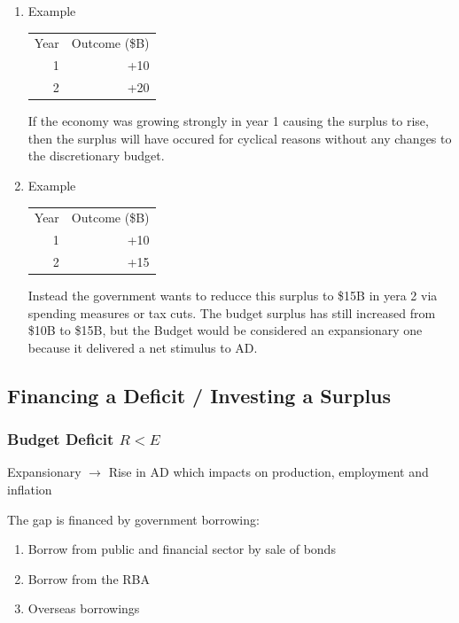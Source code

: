 \documentclass[11pt]{article}
\begin{document}
\begin{enumerate}
\item Example
\label{sec-1-8-2-1}

\begin{center}
\begin{tabular}{rr}
Year & Outcome (\$B)\\
1 & +10\\
2 & +20\\
\end{tabular}
\end{center}

If the economy was growing strongly in year 1 causing the surplus to
rise, then the surplus will have occured for cyclical reasons without
any changes to the discretionary budget.

\item Example
\label{sec-1-8-2-2}


\begin{center}
\begin{tabular}{rr}
Year & Outcome (\$B)\\
1 & +10\\
2 & +15\\
\end{tabular}
\end{center}

Instead the government wants to reducce this surplus to \$15B in yera 2
via spending measures or tax cuts. The budget surplus has still
increased from \$10B to \$15B, but the Budget would be considered an
expansionary one because it delivered a net stimulus to AD.
\end{enumerate}


\subsection{Financing a Deficit / Investing a Surplus}
\label{sec-1-9}

\subsubsection{Budget Deficit $R < E$}
\label{sec-1-9-1}

Expansionary $\rightarrow$ Rise in AD which impacts on production,
employment and inflation

The gap is financed by government borrowing:

\begin{enumerate}
\item Borrow from public and financial sector by sale of bonds
\item Borrow from the RBA
\item Overseas borrowings
\end{enumerate}
\end{document}
